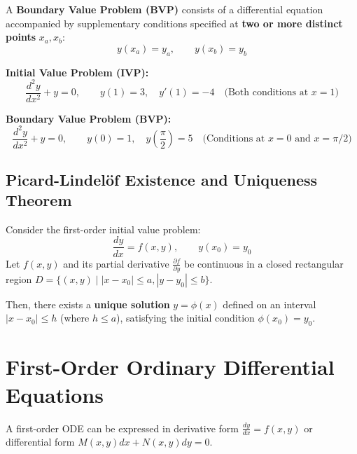 \documentclass[11pt, a4paper, openany, oneside]{book}
\begin{document}
\begin{definitionbox}
A \textbf{Boundary Value Problem (BVP)} consists of a differential equation accompanied by supplementary conditions specified at \textbf{two or more distinct points} $x_a, x_b$:
\begin{equation}
    y(x_a) = y_a, \qquad y(x_b) = y_b
\end{equation}
\end{definitionbox}

\begin{examplebox}
    \textbf{Initial Value Problem (IVP):}
    \[ \frac{d^2 y}{dx^2} + y = 0, \qquad y(1) = 3, \quad y'(1) = -4 \quad \text{(Both conditions at $x = 1$)} \]

    \textbf{Boundary Value Problem (BVP):}
    \[ \frac{d^2 y}{dx^2} + y = 0, \qquad y(0) = 1, \quad y\left(\frac{\pi}{2}\right) = 5 \quad \text{(Conditions at $x = 0$ and $x = \pi/2$)} \]
\end{examplebox}

\section{Picard-Lindelöf Existence and Uniqueness Theorem}

\begin{theorembox}
Consider the first-order initial value problem:
\begin{equation}
    \frac{dy}{dx} = f(x,y), \qquad y(x_0) = y_0
\end{equation}
Let $f(x,y)$ and its partial derivative $\frac{\partial f}{\partial y}$ be continuous in a closed rectangular region $D = \{(x,y) \mid |x - x_0| \le a, |y - y_0| \le b\}$.

Then, there exists a \textbf{unique solution} $y = \phi(x)$ defined on an interval $|x - x_0| \le h$ (where $h \le a$), satisfying the initial condition $\phi(x_0) = y_0$.
\end{theorembox}

\chapter{First-Order Ordinary Differential Equations}

A first-order ODE can be expressed in derivative form $\frac{dy}{dx} = f(x,y)$ or differential form $M(x,y)dx + N(x,y)dy = 0$.
\end{document}
